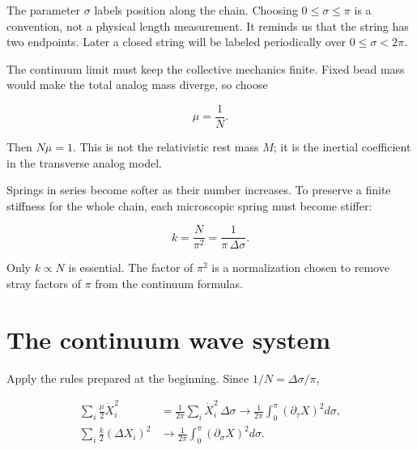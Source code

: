 The parameter \(\sigma\) labels position along the chain. Choosing
\(0\leq\sigma\leq\pi\) is a convention, not a physical length measurement.
It reminds us that the string has two endpoints. Later a closed string will
be labeled periodically over \(0\leq\sigma<2\pi\).

The continuum limit must keep the collective mechanics finite. Fixed bead
mass would make the total analog mass diverge, so choose

\begin{equation}
  \mu=\frac{1}{N}.
  \label{eq:l02-mu-scaling}
\end{equation}

Then \(N\mu=1\). This is not the relativistic rest mass \(M\); it is the
inertial coefficient in the transverse analog model.

Springs in series become softer as their number increases. To preserve a
finite stiffness for the whole chain, each microscopic spring must become
stiffer:

\begin{equation}
  k=\frac{N}{\pi^2}
  =\frac{1}{\pi\,\Delta\sigma}.
  \label{eq:l02-k-scaling}
\end{equation}

Only \(k\propto N\) is essential. The factor of \(\pi^2\) is a normalization
chosen to remove stray factors of \(\pi\) from the continuum formulas.

\begin{classroomqa}
\end{classroomqa}

\section{The continuum wave system}

Apply the rules prepared at the beginning. Since
\(1/N=\Delta\sigma/\pi\),

\begin{align}
  \sum_i\frac{\mu}{2}\dot X_i^2
  &=
  \frac{1}{2\pi}
  \sum_i\dot X_i^2\,\Delta\sigma
  \longrightarrow
  \frac{1}{2\pi}
  \int_0^\pi
  \left(\partial_\tau X\right)^2d\sigma ,
  \label{eq:l02-kinetic-limit}\\
  \sum_i\frac{k}{2}(\Delta X_i)^2
  &\longrightarrow
  \frac{1}{2\pi}
  \int_0^\pi
  \left(\partial_\sigma X\right)^2d\sigma .
  \label{eq:l02-potential-limit}
\end{align}

